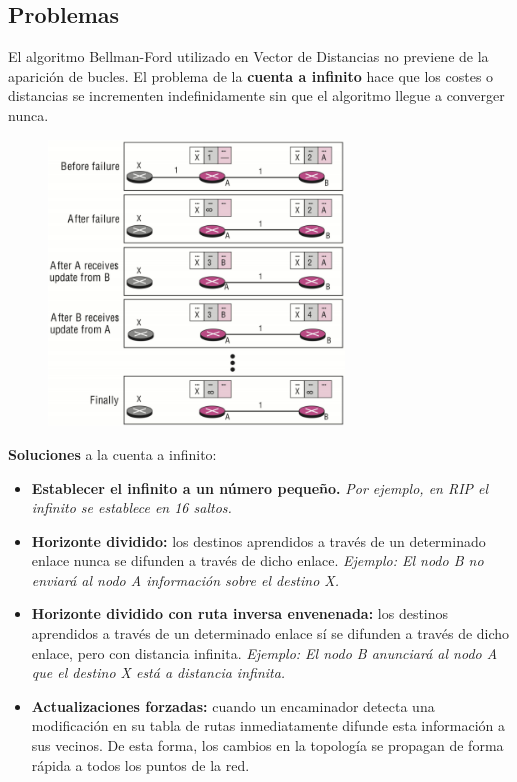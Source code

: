     \begin{onepage}
    \subsection{Problemas}
     El algoritmo Bellman-Ford utilizado en Vector de Distancias no previene de la aparición de bucles. El problema de la \textbf{cuenta a infinito} hace que los costes o distancias se incrementen indefinidamente sin que el algoritmo llegue a converger nunca.
    \begin{figure}[H]
    \centering \includegraphics[width=0.7\textwidth]{img/CuentaAInfinito.png}
    \end{figure}
    \textbf{Soluciones} a la cuenta a infinito:
    \begin{itemize}
        \item \textbf{Establecer el infinito a un número pequeño. }\textit{Por ejemplo, en RIP el infinito se establece en 16 saltos.}
        \item \textbf{Horizonte dividido: }los destinos aprendidos a través de un determinado enlace nunca se difunden a través de dicho enlace. \textit{Ejemplo: El nodo B no enviará al nodo A información sobre el destino X.}
        \item \textbf{Horizonte dividido con ruta inversa envenenada: }los destinos aprendidos a través de un determinado enlace sí se difunden a través de dicho enlace, pero con distancia infinita. \textit{Ejemplo: El nodo B anunciará al nodo A que el destino X está a distancia infinita.}
        \item \textbf{Actualizaciones forzadas: }cuando un encaminador detecta una modificación en su tabla de rutas inmediatamente difunde esta información a sus vecinos. De esta forma, los cambios en la topología se propagan de forma rápida a todos los puntos de la red.
    \end{itemize}
\end{onepage} 

